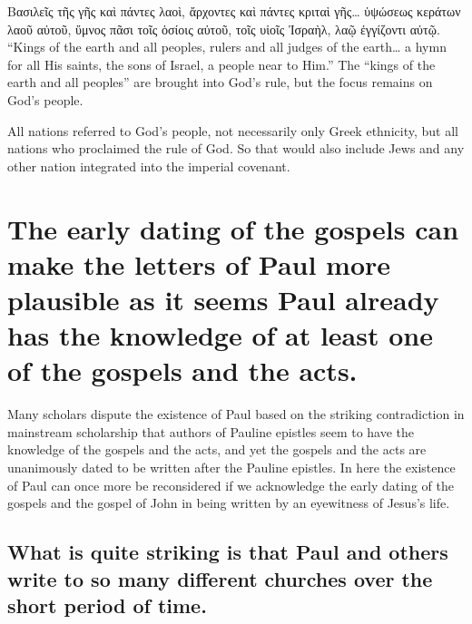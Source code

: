 Βασιλεῖς τῆς γῆς καὶ πάντες λαοὶ, ἄρχοντες καὶ πάντες κριταὶ γῆς\ldots{} ὑψώσεως κεράτων λαοῦ αὐτοῦ, ὕμνος πᾶσι τοῖς ὁσίοις αὐτοῦ, τοῖς υἱοῖς Ἰσραὴλ, λαῷ ἐγγίζοντι αὐτῷ.
``Kings of the earth and all peoples, rulers and all judges of the earth\ldots{} a hymn for all His saints, the sons of Israel, a people near to Him.''
The ``kings of the earth and all peoples'' are brought into God's rule, but the focus remains on God's people.

All nations referred to God's people, not necessarily only Greek ethnicity, but all nations who proclaimed the rule of God.
So that would also include Jews and any other nation integrated into the imperial covenant.

\section{The early dating of the gospels can make the letters of Paul more plausible as it seems Paul already has the knowledge of at least one of the gospels and the acts.}\label{sec:the-early-dating-of-the-gospels-can-make-the-letters-of-paul-more-plausible-as-it-seems-paul-already-has-the-knowledge-of-at-least-one-of-the-gospels-and-the-acts.}

Many scholars dispute the existence of Paul based on the striking contradiction in mainstream scholarship that authors of Pauline epistles seem to have the knowledge of the gospels and the acts, and yet the gospels and the acts are unanimously dated to be written after the Pauline epistles.
In here the existence of Paul can once more be reconsidered if we acknowledge the early dating of the gospels and the gospel of John in being written by an eyewitness of Jesus's life.

\subsection{What is quite striking is that Paul and others write to so many different churches over the short period of time.}\label{subsec:what-is-quite-striking-is-that-paul-and-others-write-to-so-many-different-churches-over-the-short-period-of-time.}

